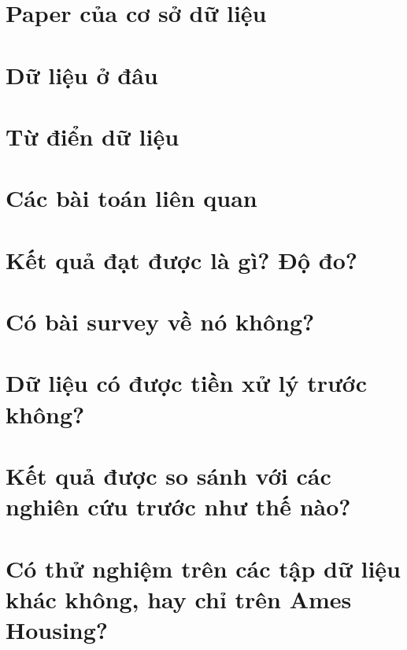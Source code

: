 \documentclass{article}
\begin{document}


\newpage

\section{Paper của cơ sở dữ liệu}


\section{Dữ liệu ở đâu}


\section{Từ điển dữ liệu}


\section{Các bài toán liên quan}


\section{Kết quả đạt được là gì? Độ đo?}


\section{Có bài survey về nó không?}


\section{Dữ liệu có được tiền xử lý trước không?}


\section{Kết quả được so sánh với các nghiên cứu trước như thế nào?}


\section{Có thử nghiệm trên các tập dữ liệu khác không, hay chỉ trên Ames Housing?}

\end{document}
